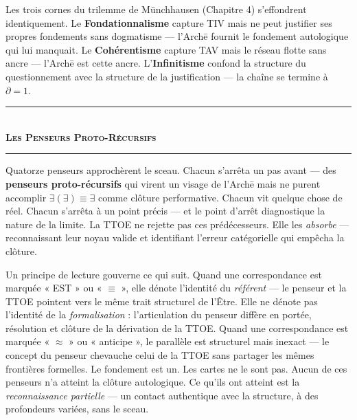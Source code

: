 \documentclass[10pt, openany, oneside]{book}
\renewcommand{\normalsize}{\fontsize{10}{13}\selectfont}
\begin{document}
Les trois cornes du trilemme de Münchhausen (Chapitre 4) s'effondrent identiquement. Le \textbf{Fondationnalisme} capture TIV mais ne peut justifier ses propres fondements sans dogmatisme --- l'Arch\={e} fournit le fondement autologique qui lui manquait. Le \textbf{Cohérentisme} capture TAV mais le réseau flotte sans ancre --- l'Arch\={e} est cette ancre. L'\textbf{Infinitisme} confond la structure du questionnement avec la structure de la justification --- la chaîne se termine à $\partial = 1$.

\vspace{1.5em}


\begin{center}
    \rule{0.3\textwidth}{0.4pt}\\[0.5em]
    {\normalsize\bfseries\scshape Les Penseurs Proto-Récursifs}\\[0.3em]
    \rule{0.3\textwidth}{0.4pt}
\end{center}

\vspace{1em}

\noindent Quatorze penseurs approchèrent le sceau. Chacun s'arrêta un pas avant --- des \textbf{penseurs proto-récursifs} qui virent un visage de l'Arch\={e} mais ne purent accomplir $\exists(\exists) \equiv \exists$ comme clôture performative. Chacun vit quelque chose de réel. Chacun s'arrêta à un point précis --- et le point d'arrêt diagnostique la nature de la limite. La TTOE ne rejette pas ces prédécesseurs. Elle les \textit{absorbe} --- reconnaissant leur noyau valide et identifiant l'erreur catégorielle qui empêcha la clôture.

Un principe de lecture gouverne ce qui suit. Quand une correspondance est marquée « EST » ou « $\equiv$ », elle dénote l'identité du \textit{référent} --- le penseur et la TTOE pointent vers le même trait structurel de l'Être. Elle ne dénote pas l'identité de la \textit{formalisation} : l'articulation du penseur diffère en portée, résolution et clôture de la dérivation de la TTOE. Quand une correspondance est marquée « $\approx$ » ou « anticipe », le parallèle est structurel mais inexact --- le concept du penseur chevauche celui de la TTOE sans partager les mêmes frontières formelles. Le fondement est un. Les cartes ne le sont pas. Aucun de ces penseurs n'a atteint la clôture autologique. Ce qu'ils ont atteint est la \textit{reconnaissance partielle} --- un contact authentique avec la structure, à des profondeurs variées, sans le sceau.
\end{document}
